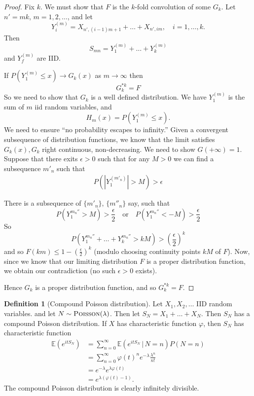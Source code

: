 \documentclass[10pt, oneside, reqno]{amsart}
\theoremstyle{plain}%
\theoremstyle{definition}
\newtheorem{defn}[thm]{Definition}
\theoremstyle{remark}
\newcommand{\given}{ \, | \,}
\renewcommand{\phi}{\varphi}
\newcommand{\E}{\mathbb{E}}
\begin{document}
\begin{proof}   
    Fix $k$.  We must show that $F$ is the $k$-fold convolution of some $G_k$.  Let $n' = mk$, $m = 1, 2, \dots$, and let \[
    Y_i^{(m)} = X_{n', (i - 1)m + 1} + \dots + X_{n', im}, \quad i = 1, \dots, k.   
    \]  Then \[
        S_{mn} = Y_1^{(m)}  + \dots + Y_k^{(m)} 
    \] and $Y_f^{(m)}$ are IID.


    If $P(Y_1^{(m)} \leq x) \rightarrow G_k(x)$ as $m \rightarrow \infty$ then \[
        G^{*k}_k = F
    \]  So we need to show that $G_k$ is a well defined distribution.  We have $Y_{1}^{(m)}$ is the sum of $m$ iid random variables, and \[
        H_m(x) = P(Y_1^{(m)} \leq x).
    \]  We need to ensure ``no probability escapes to infinity.''  Given a convergent subsequence of distribution functions, we know that the limit satisfies $G_k(x), G_k$ right continuous, non-decreasing.  We need to show $G(+\infty) = 1$.  Suppose that there exits $\epsilon > 0$ such that for any $M> 0$ we can find a subsequence $m'_n$ such that \begin{align*}
        P( |Y_1^{(m'_n)}| > M ) > \epsilon
    \end{align*}
    
    There is a subsequence of $\{ m'_n \}$, $\{ m''_n \}$ say, such that \[
        P(Y_1^{m_n''} > M) > \frac{\epsilon}{2} \quad \text{or} \quad P(Y_1^{m_n''} < -M) > \frac{\epsilon}{2}
    \] So \[
        P(Y_1^{m_n''} + \dots + Y_k^{m_n''} > kM) > \left(\frac{\epsilon}{2}\right)^k 
    \] and so $F(km) \leq 1 - \left( \frac{\epsilon}{2}\right)^k$ (modulo choosing continuity points $kM$ of $F$).  Now, since we know that our limiting distribution $F$ is a proper distribution function, we obtain our contradiction (no such $\epsilon > 0$ exists).  
    
    Hence $G_k$ is a proper distribution function, and so $G_k^{*k} = F$.    
\end{proof}
\begin{defn}[Compound Poisson distribution]
    Let $X_1, X_2, \dots$ IID random variables.  and let $N \sim \textsc{Poisson}(\lambda)$.  Then let $S_N = X_1 + \dots + X_N$.  Then $S_N$ has a compound Poisson distribution.  If $X$ has characteristic function $\phi$, then $S_N$ has characteristic function \begin{align*}
        \E(e^{itS_N}) &= \sum_{n = 0}^\infty \E(e^{itS_N} \given N = n) P(N = n) \\
                    &= \sum_{n = 0}^\infty \phi(t)^n e^{- \lambda} \frac{\lambda^n}{n!} \\
                    &= e^{- \lambda} e^{\lambda \phi(t)} \\
                    &= e^{\lambda(\phi(t) - 1)}.
    \end{align*}  The compound Poisson distribution is clearly infinitely divisible.  
\end{defn}
\end{document}
